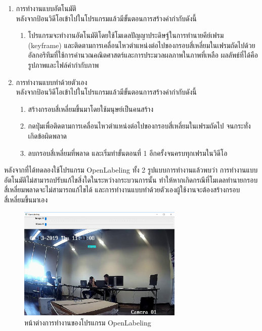 \begin{enumerate}
	\setlength\itemsep{-0.25em}
	\item การทำงานแบบอัตโนมัติ 
	\\ หลังจากป้อนวิดีโอเข้าไปในโปรแกรมแล้วมีขั้นตอนการสร้างคำกำกับดังนี้ 
   	\begin{enumerate}
	\setlength\itemsep{-0.25em}
		\item โปรแกรมจะทำงานอัตโนมัติโดยใช้โมเดลปัญญาประดิษฐ์ในการทำนายคีย์เฟรม (keyframe) 
		และติดตามการเคลื่อนไหวตำแหน่งต่อไปของกรอบสี่เหลี่ยมในเฟรมถัดไปด้วยอัลกอริทึมที่ใช้การคำนวณคณิตศาสตร์และการประมวลผลภาพในภาพที่เหลือ ผลลัพธ์ที่ได้คือรูปภาพและไฟล์คำกำกับภาพ
 	\end{enumerate}
	\item การทำงานแบบทำด้วยตัวเอง 
	\\ หลังจากป้อนวิดีโอเข้าไปในโปรแกรมแล้วมีขั้นตอนการสร้างคำกำกับดังนี้ 
	\begin{enumerate}
	\setlength\itemsep{-0.25em}
		\item สร้างกรอบสี่เหลี่ยมขึ้นมาโดยใช้มนุษย์เป็นคนสร้าง
		\item กดปุ่มเพื่อติดตามการเคลื่อนไหวตำแหน่งต่อไปของกรอบสี่เหลี่ยมในเฟรมถัดไป จนกระทั่งเกิดข้อผิดพลาด
		\item ลบกรอบสี่เหลี่ยมที่พลาด และเริ่มทำขั้นตอนที่ 1 อีกครั้งจนครบทุกเฟรมในวิดีโอ
 	\end{enumerate}
 \end{enumerate}

หลังจากที่ได้ทดลองใช้โปรแกรม OpenLabeling ทั้ง 2 รูปแบบการทำงานแล้วพบว่า การทำงานแบบอัตโนมัติไม่สามารถปรับแก้ไขสิ่งใดในระหว่างกระบวนการนั้น 
ทำให้หากเกิดกรณีที่โมเดลทำนายกรอบสี่เหลี่ยมพลาดจะไม่สามารถแก้ไขได้ และการทำงานแบบทำด้วยตัวเองผู้ใช้งานจะต้องสร้างกรอบสี่เหลี่ยมขึ้นมาเอง

\begin{figure}[!ht]
	\centering
	\includegraphics[width=0.7\textwidth]{chapter2/images/openlabel.png}
		\caption{หน้าต่างการทำงานของโปรแกรม OpenLabeling}
    	\label{fig:openlabel}
\end{figure}


